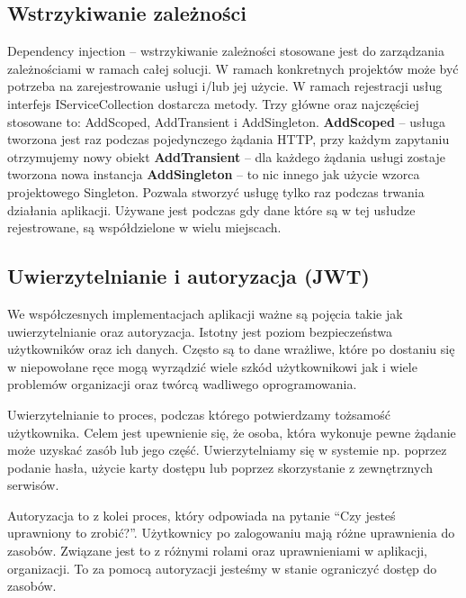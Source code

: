 \documentclass[a4paper,twoside,12pt]{book}
\begin{document}
\subsection{Wstrzykiwanie zależności}
Dependency injection -- wstrzykiwanie zależności stosowane jest do zarządzania zależnościami w ramach całej solucji. W ramach konkretnych projektów może być potrzeba na zarejestrowanie usługi i/lub jej użycie. W ramach rejestracji usług interfejs IServiceCollection dostarcza metody. Trzy główne oraz najczęściej stosowane to: AddScoped, AddTransient i AddSingleton. 
\textbf{AddScoped} -- usługa tworzona jest raz podczas pojedynczego żądania HTTP, przy każdym zapytaniu otrzymujemy nowy obiekt 
\textbf{AddTransient} -- dla każdego żądania usługi zostaje tworzona nowa instancja 
\textbf{AddSingleton} -- to nic innego jak użycie wzorca projektowego Singleton. Pozwala stworzyć usługę tylko raz podczas trwania działania aplikacji. Używane jest podczas gdy dane które są w tej usłudze rejestrowane, są współdzielone w wielu miejscach. 


\subsection{Uwierzytelnianie i autoryzacja (JWT)}
We współczesnych implementacjach aplikacji ważne są pojęcia takie jak uwierzytelnianie oraz autoryzacja. Istotny jest poziom bezpieczeństwa użytkowników oraz ich danych. Często są to dane wrażliwe, które po dostaniu się w niepowołane ręce mogą wyrządzić wiele szkód użytkownikowi jak i wiele problemów organizacji oraz twórcą wadliwego oprogramowania. 

Uwierzytelnianie to proces, podczas którego potwierdzamy tożsamość użytkownika. Celem jest upewnienie się, że osoba, która wykonuje pewne żądanie może uzyskać zasób lub jego część. Uwierzytelniamy się w systemie np. poprzez podanie hasła, użycie karty dostępu lub poprzez skorzystanie z zewnętrznych serwisów. 

Autoryzacja to z kolei proces, który odpowiada na pytanie “Czy jesteś uprawniony to zrobić?”. Użytkownicy po zalogowaniu mają różne uprawnienia do zasobów. Związane jest to z różnymi rolami oraz uprawnieniami w aplikacji, organizacji. To za pomocą autoryzacji jesteśmy w stanie ograniczyć dostęp do zasobów. 
\end{document}
